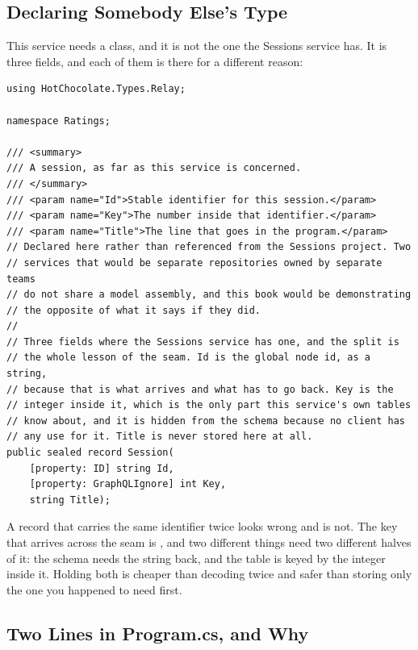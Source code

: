 \subsection{Declaring Somebody Else's Type}

%
This service needs a  class, and it is not the one the Sessions
service has. It is three fields, and each of them is there for a different
reason:

\begin{verbatim}
using HotChocolate.Types.Relay;

namespace Ratings;

/// <summary>
/// A session, as far as this service is concerned.
/// </summary>
/// <param name="Id">Stable identifier for this session.</param>
/// <param name="Key">The number inside that identifier.</param>
/// <param name="Title">The line that goes in the program.</param>
// Declared here rather than referenced from the Sessions project. Two
// services that would be separate repositories owned by separate teams
// do not share a model assembly, and this book would be demonstrating
// the opposite of what it says if they did.
//
// Three fields where the Sessions service has one, and the split is
// the whole lesson of the seam. Id is the global node id, as a string,
// because that is what arrives and what has to go back. Key is the
// integer inside it, which is the only part this service's own tables
// know about, and it is hidden from the schema because no client has
// any use for it. Title is never stored here at all.
public sealed record Session(
    [property: ID] string Id,
    [property: GraphQLIgnore] int Key,
    string Title);
\end{verbatim}

%
A record that carries the same identifier twice looks wrong and is not. The
key that arrives across the seam is , and two different
things need two different halves of it: the schema needs the string back, and
the  table is keyed by the integer inside it. Holding both is
cheaper than decoding twice and safer than storing only the one you happened to
need first.

\subsection{Two Lines in Program.cs, and Why}

